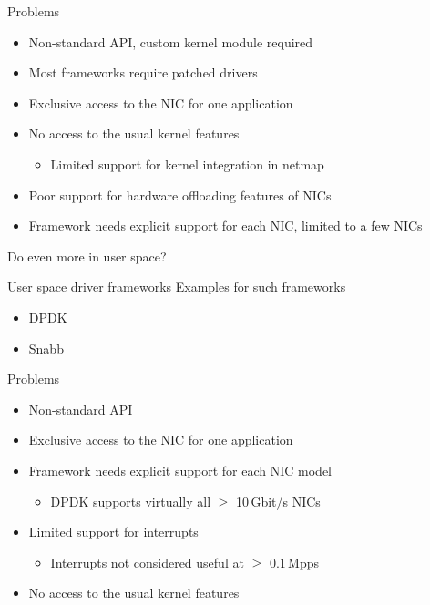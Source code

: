 \documentclass[NET,english,aspectratio=169]{tumbeamer}
\begin{document}
\begin{frame}{Problems}
\begin{itemize}
\item Non-standard API, custom kernel module required
\item Most frameworks require patched drivers
\item Exclusive access to the NIC for one application
\item No access to the usual kernel features
\begin{itemize}
\item Limited support for kernel integration in netmap
\end{itemize}
\item Poor support for hardware offloading features of NICs
\item Framework needs explicit support for each NIC, limited to a few NICs
\end{itemize}
\end{frame}

\begin{frame}{Do even more in user space?}
\centering
\end{frame}

\begin{frame}{User space driver frameworks}
Examples for such frameworks
\begin{itemize}
\item DPDK
\item Snabb
\end{itemize}
\end{frame}

\begin{frame}{Problems}
\begin{itemize}
\item Non-standard API
\item Exclusive access to the NIC for one application
\item Framework needs explicit support for each NIC model
\begin{itemize}
\item DPDK supports virtually all $\ge$ 10\,Gbit/s NICs
\end{itemize}
\item Limited support for interrupts
\begin{itemize}
\item Interrupts not considered useful at $\ge$ 0.1\,Mpps
\end{itemize}
\item No access to the usual kernel features
\end{itemize}
\end{frame}
\end{document}
